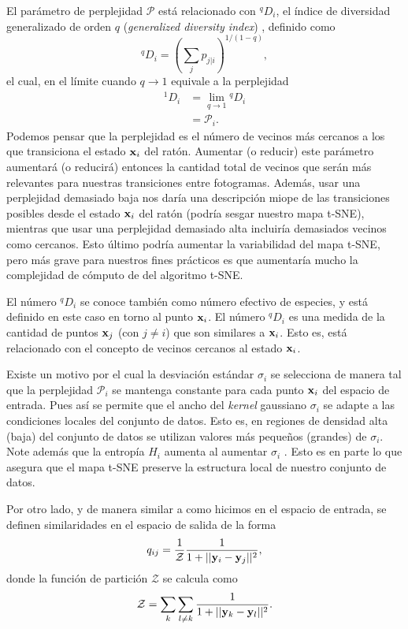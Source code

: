 El parámetro de perplejidad $\mathcal{P}$ está relacionado con ${}^{q}D_i$, el índice de diversidad generalizado de orden $q$ (\textit{generalized diversity index}) \cite{jost_diversity, shannon_communication}, definido como
\begin{equation}
    ^{q}D_i = \left(\sum_{j} p_{j|i} \right)^{1/(1-q)},
\end{equation}
el cual, en el límite cuando $q\rightarrow 1$ equivale a la perplejidad
\begin{align}
    {}^{1}D_i &= \lim_{q \to 1} {}^{q}D_i\\
    &= \mathcal{P}_i.
\end{align}
Podemos pensar que la perplejidad es el número de vecinos más cercanos a los que transiciona el estado $\vb{x}_i$ del ratón. Aumentar (o reducir) este parámetro aumentará (o reducirá) entonces la cantidad total de vecinos que serán más relevantes para nuestras transiciones entre fotogramas. Además, usar una perplejidad demasiado baja nos daría una descripción miope de las transiciones posibles desde el estado $\vb{x}_i$ del ratón (podría sesgar nuestro mapa t-SNE), mientras que usar una perplejidad demasiado alta incluiría demasiados vecinos como cercanos. Esto último podría aumentar la variabilidad del mapa t-SNE, pero más grave para nuestros fines prácticos es que aumentaría mucho la complejidad de cómputo de del algoritmo t-SNE.

El número ${}^{q}D_i$ se conoce también como número efectivo de especies, y está definido en este caso en torno al punto $\vb{x}_i$. El número ${}^{q}D_i$ es una medida de la cantidad de puntos $\vb{x}_j$ (con $j \neq i$) que son similares a $\vb{x}_i$. Esto es, está relacionado con el concepto de vecinos cercanos al estado $\vb{x}_i$.

Existe un motivo por el cual la desviación estándar $\sigma_i$ se selecciona de manera tal que la perplejidad $\mathcal{P}_i$ se mantenga constante para cada punto $\vb{x}_i$ del espacio de entrada. Pues así se permite que el ancho del \textit{kernel} gaussiano $\sigma_i$ se adapte a las condiciones locales del conjunto de datos. Esto es, en regiones de densidad alta (baja) del conjunto de datos se utilizan valores más pequeños (grandes) de $\sigma_i$. Note además que la entropía $H_i$ aumenta al aumentar $\sigma_i$ \cite{vdm_tsne}. Esto es en parte lo que asegura que el mapa t-SNE preserve la estructura local de nuestro conjunto de datos.

Por otro lado, y de manera similar a como hicimos en el espacio de entrada, se definen similaridades en el espacio de salida de la forma
\begin{equation}
    q_{ij} = \frac{1}{\mathcal{Z}} \frac{1}{ 1 + ||\vb{y}_i - \vb{y}_j||^2 },
\end{equation}
donde la función de partición $\mathcal{Z}$ se calcula como
\begin{equation}
    \mathcal{Z} = \sum_{k} \sum_{l\neq k} \frac{1}{1+||\vb{y}_k-\vb{y}_l||^2}.
\end{equation}

